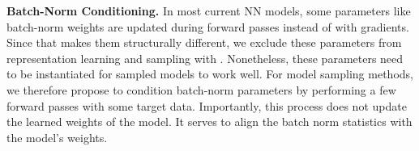 \textbf{Batch-Norm Conditioning.}
In most current NN models, some parameters like batch-norm weights are updated during forward passes instead of with gradients. 
Since that makes them structurally different, we exclude these parameters from representation learning and sampling with \ourmethod.
Nonetheless, these parameters need to be instantiated for sampled models to work well. 
For model sampling methods, we therefore propose to condition batch-norm parameters by performing a few forward passes with some target data. 
Importantly, this process does not update the learned weights of the model. 
It serves to align the batch norm statistics with the model's weights.